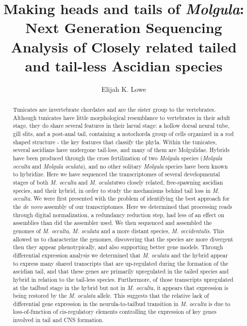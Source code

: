 \documentclass{msuphddissertation}
\author{Elijah K. Lowe} %
\title{Making heads and tails of \textit{Molgula}: Next Generation Sequencing Analysis of Closely related tailed and tail-less Ascidian species} %
\begin{document}
\maketitlepage %
\begin{abstract}
Tunicates are invertebrate chordates and are the sister group to the vertebrates. Although tunicates have little morphological resemblance to vertebrates in their adult stage, they do share several features in their larval stage: a hollow dorsal neural tube, gill slits, and a post-anal tail, containing a notochord\textemdash a group of cells organized in a rod shaped structure - the key features that classify the phyla. Within the tunicates, several ascidians have undergone tail-loss, and many of them are Molgulidae. Hybrids have been produced through the cross fertilization of two \textit{Molgula} species (\textit{Molgula occulta} and \textit{Molgula oculata}), and no other solitary \textit{Molgula} species have been known to hybridize. Here we have sequenced the transcriptomes of several developmental stages of both \textit{M. occulta} and \textit{M. oculata}\textemdash two closely related, free-spawning ascidian species, and their hybrid, in order to study the mechanisms behind tail loss in \textit{M. occulta}. We were first presented with the problem of identifying the best approach for the \textit{de novo} assembly of our transcriptomes. Here we determined that processing reads through digital normalization, a redundancy reduction step, had less of an effect on assemblies than did the assembler used. We then sequenced and assembled the genomes of  \textit{M. occulta}, \textit{M. oculata} and a more distant species, \textit{M. occidentalis}. This allowed us to characterize the genomes, discovering that the species are more divergent then they appear phenotypically, and also supporting better gene models. Through differential expression analysis we determined that \textit{M. oculata} and the hybrid appear to express many shared transcripts that are up-regulated during the formation of the ascidian tail, and that these genes are primarily upregulated in the tailed species and hybrid in relation to the tail-less species. Furthermore, of those transcripts upregulated at the tailbud stage in the hybrid but not in \textit{M. occulta}, it appears that expression is being restored by the \textit{M. oculata} allele. This suggests that the relative lack of differential gene expression in the neurula-to-tailbud transition in \textit{M. occulta} is due to loss-of-function of cis-regulatory elements controlling the expression of key genes involved in tail and CNS formation.
\end{abstract}
\end{document}
